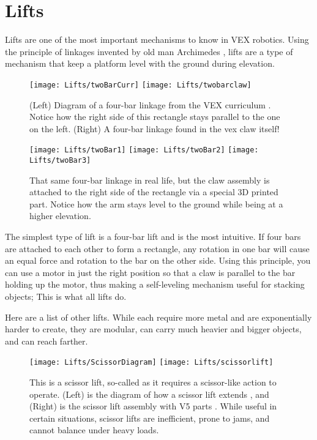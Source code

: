\section{Lifts}

Lifts are one of the most important mechanisms to know in VEX robotics. Using the principle of linkages invented by old man Archimedes \cite{Linkage}, lifts are a type of mechanism that keep a platform level with the ground during elevation.

\begin{figure}[h]
    \centering
    \texttt{[image: Lifts/twoBarCurr]}
    \texttt{[image: Lifts/twobarclaw]}
    \caption{
    (Left) Diagram of a four-bar linkage from the VEX curriculum \cite{LinkageCurr}. Notice how the right side of this rectangle stays parallel to the one on the left. (Right) A four-bar linkage found in the vex claw itself!
    }
\end{figure}

\begin{figure}[h]
    \centering
    \texttt{[image: Lifts/twoBar1]}
    \texttt{[image: Lifts/twoBar2]}
    \texttt{[image: Lifts/twoBar3]}
    \caption{
    That same four-bar linkage in real life, but the claw assembly is attached to the right side of the rectangle via a special 3D printed part. Notice how the arm stays level to the ground while being at a higher elevation.
    }
\end{figure}

The simplest type of lift is a four-bar lift and is the most intuitive. If four bars are attached to each other to form a rectangle, any rotation in one bar will cause an equal force and rotation to the bar on the other side. Using this principle, you can use a motor in just the right position so that a claw is parallel to the bar holding up the motor, thus making a self-leveling mechanism useful for stacking objects; This is what all lifts do.

Here are a list of other lifts. While each require more metal and are exponentially harder to create, they are modular, can carry much heavier and bigger objects, and can reach farther.


\begin{figure}[h]
    \centering
    \texttt{[image: Lifts/ScissorDiagram]}
    \texttt{[image: Lifts/scissorlift]}
    \caption{
    This is a scissor lift, so-called as it requires a scissor-like action to operate. (Left) is the diagram of how a scissor lift extends \cite{ScissorDiagram}, and (Right) is the scissor lift assembly with V5 parts \cite{V5Lifts}. While useful in certain situations, scissor lifts are inefficient, prone to jams, and cannot balance under heavy loads.
    }
\end{figure}



